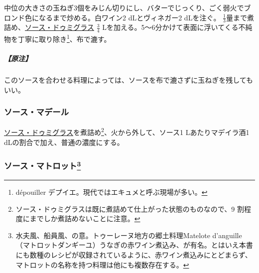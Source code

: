 \begin{recette}

 

中位の大きさの玉ねぎ3個をみじん切りにし、バターでじっくり、ごく弱火でブロンド色になるまで炒める。白ワイン2
dLとヴィネガー2 dLを注ぐ。
\(\frac{1}{3}\)量まで煮詰め、\protect\hyperlink{sauce-demi-glace}{ソース・ドゥミグラス}
\(\frac{3}{4}\)
Lを加える。5〜6分かけて表面に浮いてくる不純物を丁寧に取り除き\footnote{dépouiller
  デプイエ。現代ではエキュメと呼ぶ現場が多い。}、布で漉す。

\hypertarget{nota-sauce-lyonnaise}{%
\subparagraph{【原注】}\label{nota-sauce-lyonnaise}}

このソースを合わせる料理によっては、ソースを布で漉さずに玉ねぎを残してもいい。

\atoaki{}

\hypertarget{sauce-madere}{%
\subsubsection{ソース・マデール}\label{sauce-madere}}


 

\protect\hyperlink{sauce-demi-glace}{ソース・ドゥミグラス}を煮詰め\footnote{ソース・ドゥミグラスは既に煮詰めて仕上がった状態のものなので、9
  割程度にまでしか煮詰めないことに注意。}、火から外して、ソース1
Lあたりマデイラ酒1 dLの割合で加え、普通の濃度にする。

\atoaki{}

\hypertarget{sauce-matelote}{%
\subsubsection[ソース・マトロット]{\texorpdfstring{ソース・マトロット\footnote{水夫風、船員風、の意。トゥーレーヌ地方の郷土料理Matelote
  d'anguille（マトロットダンギーユ）うなぎの赤ワイン煮込み、が有名。とはいえ本書にも数種のレシピが収録されているように、赤ワイン煮込みにとどまらず、マトロットの名称を持つ料理は他にも複数存在する。}}{ソース・マトロット}}\label{sauce-matelote}}


\end{recette}

